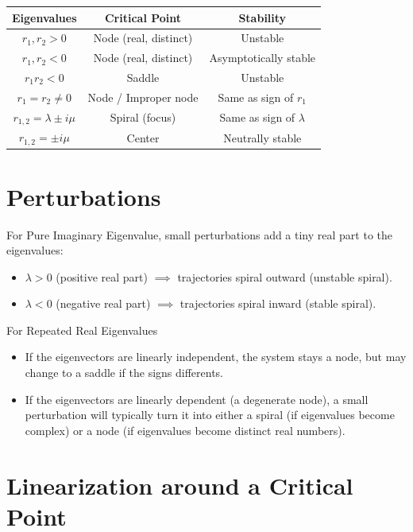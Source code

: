 \renewcommand{\arraystretch}{1.1} %
\begin{tabular}{|c|c|c|}
\hline
\textbf{Eigenvalues} & \textbf{Critical Point} & \textbf{Stability} \\
\hline
$r_1, r_2 > 0$ & Node (real, distinct) & Unstable \\
$r_1, r_2 < 0$ & Node (real, distinct) & Asymptotically stable \\
$r_1 r_2 < 0$ & Saddle & Unstable \\
$r_1 = r_2 \neq 0$ & Node / Improper node & Same as sign of $r_1$ \\
$r_{1,2} = \lambda \pm i\mu$ & Spiral (focus) & Same as sign of $\lambda$ \\
$r_{1,2} = \pm i\mu$ & Center & Neutrally stable \\
\hline
\end{tabular}

\section*{Perturbations}

For Pure Imaginary Eigenvalue,
small perturbations add a tiny real part to the eigenvalues:

\begin{itemize}
    \item $\lambda > 0$ (positive real part) $\implies$ trajectories spiral outward (unstable spiral).
    \item $\lambda < 0$ (negative real part) $\implies$ trajectories spiral inward (stable spiral).
\end{itemize}

For Repeated Real Eigenvalues

\begin{itemize}
    \item If the eigenvectors are linearly independent, the system stays a node, but may change to a saddle if the signs differents.
    \item If the eigenvectors are linearly dependent (a degenerate node),
    a small perturbation will typically turn it into either a spiral
    (if eigenvalues become complex) or a node
    (if eigenvalues become distinct real numbers).
\end{itemize}

\section*{Linearization around a Critical Point}

